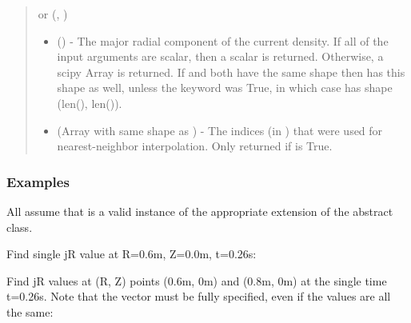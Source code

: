 \documentclass[letterpaper,10pt,english]{sphinxmanual}
\begin{document}
\begin{fulllineitems}
\begin{fulllineitems}
\begin{quote}
\begin{description}
 or (, )
\begin{itemize}
\item {} 
 () - The major radial component of
the current density. If all of the input arguments are scalar, then
a scalar is returned. Otherwise, a scipy Array is returned. If 
and  both have the same shape then  has this shape as well,
unless the  keyword was True, in which case  has
shape (len(), len()).

\item {} 
 (Array with same shape as ) - The indices
(in ) that were used for
nearest-neighbor interpolation. Only returned if  is
True.

\end{itemize}


\end{description}\end{quote}
\subsubsection*{Examples}

All assume that  is a valid instance of the appropriate
extension of the {\hyperref[\detokenize{eqtools:eqtools.core.Equilibrium}]{}} abstract class.

Find single jR value at R=0.6m, Z=0.0m, t=0.26s:

\begin{sphinxVerbatim}[commandchars=\\\{\}]
    
\end{sphinxVerbatim}

Find jR values at (R, Z) points (0.6m, 0m) and (0.8m, 0m) at the
single time t=0.26s. Note that the  vector must be fully
specified, even if the values are all the same:

\begin{sphinxVerbatim}[commandchars=\\\{\}]
  \PYG{p}{[} \PYG{p}{]} \PYG{p}{[} \PYG{p}{]} 
\end{sphinxVerbatim}


\end{fulllineitems}
\end{fulllineitems}
\end{document}
